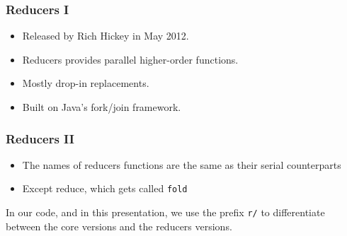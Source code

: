 \documentclass{beamer}
\newcommand{\clocode}[1]{{\texttt {#1}}}
\begin{document}
\begin{frame}[fragile]
\frametitle{Reducers I}
	\begin{itemize}
	 \item Released by Rich Hickey in May 2012.
	 \item Reducers provides parallel higher-order functions.
	 \item Mostly drop-in replacements.
	 \item Built on Java's fork/join framework.
	\end{itemize}	
\end{frame}

\begin{frame}[fragile]
\frametitle{Reducers II}
	\begin{itemize}
	 \item The names of reducers functions are the same as their serial counterparts
	 \item Except reduce, which gets called \clocode{fold}
	\end{itemize}	
	In our code, and in this presentation, we use the prefix \clocode{r/} to differentiate between the core versions and the reducers versions.
	
\end{frame}
\end{document}
